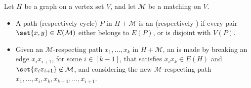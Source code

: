 \documentclass[10pt,a4paper,reqno]{amsart}
\begin{document}
\begin{definition}
  Let $H$ be a graph on a vertex set $V$, and let $\mathcal{M}$ be a matching on $V$.
  \begin{itemize}
  \item A path (respectively cycle) $P$ in $H + \mathcal{M}$ is an  (respectively ) if every pair $\set{x, y} \in E(\mathcal{M})$ either belongs to $E(P)$, or is disjoint with $V(P)$.
  \item Given an $\mathcal{M}$-respecting path $x_1, \dots, x_k$ in $H + \mathcal{M}$, an  is made by breaking an edge $x_ix_{i + 1}$, for some $i\in [k-1]$, that satisfies $x_ix_k \in E(H)$ and $\set{x_ix_{i + 1}} \not\in \mathcal{M}$, and considering the new $\mathcal{M}$-respecting path $x_1, \dots, x_i, x_k, x_{k - 1}, \dots, x_{i + 1}$.
  \end{itemize}
\end{definition}
\end{document}
